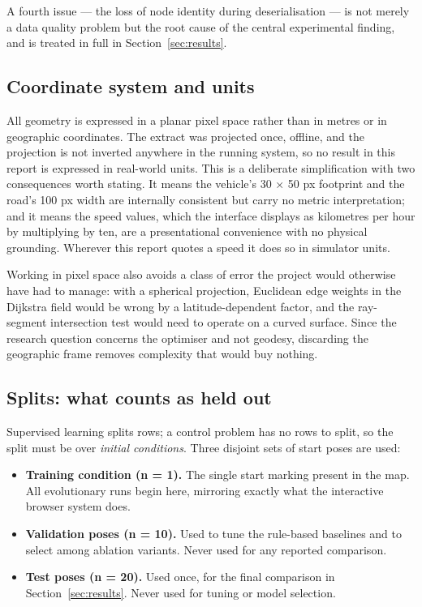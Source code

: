 \documentclass[conference]{IEEEtran}
\begin{document}
A fourth issue — the loss of node identity during deserialisation — is not merely a data quality problem but the root cause of the central experimental finding, and is treated in full in Section~\ref{sec:results}.

\subsection{Coordinate system and units}

All geometry is expressed in a planar pixel space rather than in metres or in geographic coordinates. The extract was projected once, offline, and the projection is not inverted anywhere in the running system, so no result in this report is expressed in real-world units. This is a deliberate simplification with two consequences worth stating. It means the vehicle's 30 × 50 px footprint and the road's 100 px width are internally consistent but carry no metric interpretation; and it means the speed values, which the interface displays as kilometres per hour by multiplying by ten, are a presentational convenience with no physical grounding. Wherever this report quotes a speed it does so in simulator units.

Working in pixel space also avoids a class of error the project would otherwise have had to manage: with a spherical projection, Euclidean edge weights in the Dijkstra field would be wrong by a latitude-dependent factor, and the ray-segment intersection test would need to operate on a curved surface. Since the research question concerns the optimiser and not geodesy, discarding the geographic frame removes complexity that would buy nothing.

\subsection{Splits: what counts as held out}

Supervised learning splits rows; a control problem has no rows to split, so the split must be over \emph{initial conditions}. Three disjoint sets of start poses are used:

\begin{itemize}
\item \textbf{Training condition (n = 1).} The single start marking present in the map. All evolutionary runs begin here, mirroring exactly what the interactive browser system does.
\item \textbf{Validation poses (n = 10).} Used to tune the rule-based baselines and to select among ablation variants. Never used for any reported comparison.
\item \textbf{Test poses (n = 20).} Used once, for the final comparison in Section~\ref{sec:results}. Never used for tuning or model selection.
\end{itemize}
\end{document}
